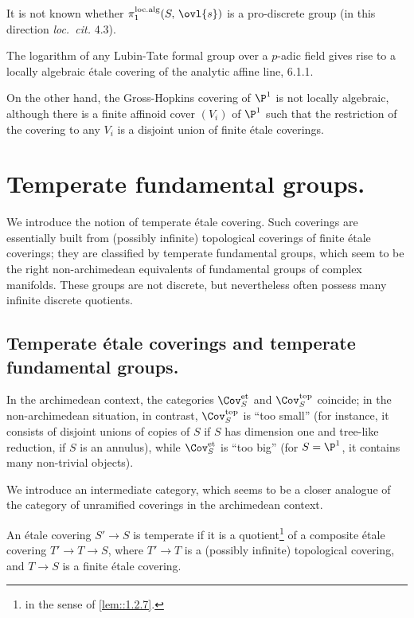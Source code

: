 \medskip\noindent It is not known whether
$\pi_1^{\mathrm{loc.alg}}(S,\,\ovl{s})$ is a pro-discrete group (\cf in
this direction {\it loc.~cit.} 4.3). 

\medskip{} The logarithm of any Lubin-Tate formal
group over a $p$-adic field gives rise to a locally algebraic 
\'etale covering of the analytic affine line,  6.1.1.

On the other hand, the Gross-Hopkins covering of $\P^1$ is not locally
algebraic, although there is a finite affinoid 
cover $(V_i)$ of $\P^1$ such that the restriction of the covering to any
$V_i$ is a disjoint union of finite \'etale coverings.

\newpage
\section{Temperate fundamental groups.}\label{sec::2}

\begin{abst}
We introduce the notion of temperate \'etale
covering. Such coverings are essentially built from (possibly infinite)
topological coverings of finite \'etale coverings; they are classified
by temperate fundamental groups, which seem to be the right
non-archimedean equivalents of fundamental groups of complex
manifolds. These groups are not discrete, but nevertheless often possess
many infinite discrete quotients.
\end{abst}
   

\subsection{Temperate \'etale coverings and temperate fundamental
groups.}\label{sub::2.1}

\medskip In the archimedean context, the categories
$\Cov^{\mathrm{et}}_S$ and $\Cov^{\mathrm{top}}_S$ coincide; in the
non-archimedean situation, in contrast, $\Cov^{\mathrm{top}}_S$ is ``too
small'' (for instance, it consists of disjoint unions of copies of $S$
if $S$ has dimension one and tree-like reduction, \eg if $S$ is an
annulus), while  $\Cov^{\mathrm{et}}_S$ is ``too big'' (for $S=\P^1$, it
contains many non-trivial objects).

We introduce an intermediate category, which seems to be a closer
analogue of the category of unramified coverings in the 
archimedean context.
 
\begin{dfn}\label{def::2.1.1} An \'etale covering $S'\to S$ is {\rm
 temperate} if it is a quotient\footnote{in the sense of
 \ref{lem::1.2.7}.} of a 
 composite \'etale covering $T'\to T\to S$, where $T'\to T$ is a
 (possibly infinite) topological covering, and $T\to S$ is a finite
 \'etale covering.
\end{dfn}

